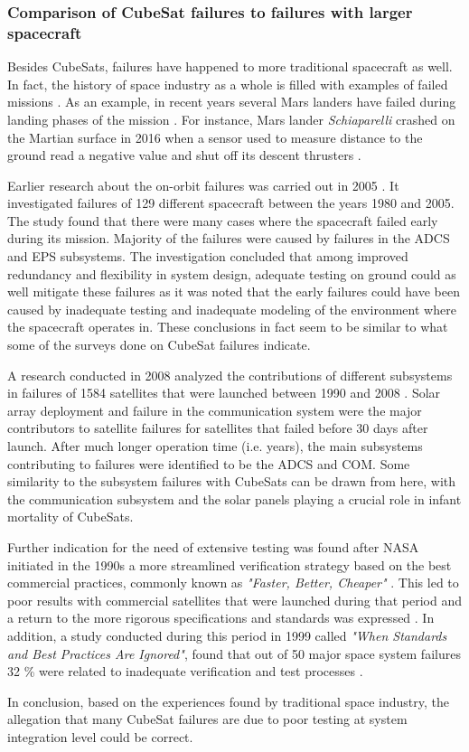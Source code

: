 \documentclass[english,12pt,a4paper,pdftex,elec,utf8]{aaltothesis}
\begin{document}
\subsubsection{Comparison of CubeSat failures to failures with larger spacecraft}
Besides CubeSats, failures have happened to more traditional spacecraft as well. In fact, the history of space industry as a whole is filled with examples of failed missions \cite{failureshistory}. As an example, in recent years several Mars landers have failed during landing phases of the mission \cite{marsfailures}. For instance, Mars lander \textit{Schiaparelli} crashed on the Martian surface in 2016 when a sensor used to measure distance to the ground read a negative value and shut off its descent thrusters \cite{schiaparelli}.\par
Earlier research about the on-orbit failures was carried out in 2005 \cite{onorbitfailures}. It investigated failures of 129 different spacecraft between the years 1980 and 2005. The study found that there were many cases where the spacecraft failed early during its mission. Majority of the failures were caused by failures in the ADCS and EPS subsystems. The investigation concluded that among improved redundancy and flexibility in system design, adequate testing on ground could as well mitigate these failures as it was noted that the early failures could have been caused by inadequate testing and inadequate modeling of the environment where the spacecraft operates in. These conclusions in fact seem to be similar to what some of the surveys done on CubeSat failures indicate. \cite{onorbitfailures} \par
A research conducted in 2008 analyzed the contributions of different subsystems in failures of  1584 satellites that were launched between 1990 and 2008 \cite{satsubsystems}. Solar array deployment and failure in the communication system were the major contributors to satellite failures for satellites that failed before 30 days after launch. After much longer operation time (i.e. years), the main subsystems contributing to failures were identified to be the ADCS and COM. Some similarity to the subsystem failures with CubeSats can be drawn from here, with the communication subsystem and the solar panels playing a crucial role in infant mortality of CubeSats.\par 
Further indication for the need of extensive testing was found after NASA initiated in the 1990s a more streamlined verification strategy based on the best commercial practices, commonly known as \textit{"Faster, Better, Cheaper"} \cite{satverplanning}. This led to poor results with commercial satellites that were launched during that period and a return to the more rigorous specifications and standards was expressed \cite{satverplanning}. In addition, a study conducted during this period in 1999 called \textit{"When Standards and Best Practices Are Ignored"}, found that out of 50 major space system failures 32 \% were related to inadequate verification and test processes \cite{whenstandignored}.\par 
In conclusion, based on the experiences found by traditional space industry, the allegation that many CubeSat failures are due to poor testing at system integration level could be correct.\par 
\end{document}
